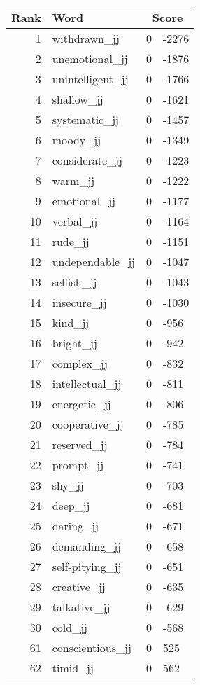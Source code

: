 \begin{longtable}[!htbp]{| rlr@{.}l |}
    \hline
    \textbf{Rank} & \textbf{Word} & \multicolumn{2}{c|}{\textbf{Score}} \\
    \hline
    \endhead
    1 & withdrawn\_jj & 0 & -2276 \\
    2 & unemotional\_jj & 0 & -1876 \\
    3 & unintelligent\_jj & 0 & -1766 \\
    4 & shallow\_jj & 0 & -1621 \\
    5 & systematic\_jj & 0 & -1457 \\
    6 & moody\_jj & 0 & -1349 \\
    7 & considerate\_jj & 0 & -1223 \\
    8 & warm\_jj & 0 & -1222 \\
    9 & emotional\_jj & 0 & -1177 \\
    10 & verbal\_jj & 0 & -1164 \\
    11 & rude\_jj & 0 & -1151 \\
    12 & undependable\_jj & 0 & -1047 \\
    13 & selfish\_jj & 0 & -1043 \\
    14 & insecure\_jj & 0 & -1030 \\
    15 & kind\_jj & 0 & -956 \\
    16 & bright\_jj & 0 & -942 \\
    17 & complex\_jj & 0 & -832 \\
    18 & intellectual\_jj & 0 & -811 \\
    19 & energetic\_jj & 0 & -806 \\
    20 & cooperative\_jj & 0 & -785 \\
    21 & reserved\_jj & 0 & -784 \\
    22 & prompt\_jj & 0 & -741 \\
    23 & shy\_jj & 0 & -703 \\
    24 & deep\_jj & 0 & -681 \\
    25 & daring\_jj & 0 & -671 \\
    26 & demanding\_jj & 0 & -658 \\
    27 & self-pitying\_jj & 0 & -651 \\
    28 & creative\_jj & 0 & -635 \\
    29 & talkative\_jj & 0 & -629 \\
    30 & cold\_jj & 0 & -568 \\
    61 & conscientious\_jj & 0 & 525 \\
    62 & timid\_jj & 0 & 562 \\

\end{longtable}
